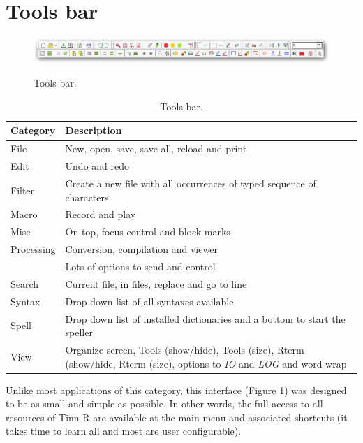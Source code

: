 
\hypertarget{working_toolsbar}{}
\section{Tools bar}

\begin{figure}[h!]
  \includegraphics[scale=0.35]{./res/toolsbar.png}\\
  \caption{Tools bar.}
  \label{fig:toolsbar}
\end{figure}

\begin{table}[h!]
  \begin{footnotesize}
    \begin{tabularx}{\textwidth}{>{\hsize=0.3\hsize}X>{\hsize=0.7\hsize}X}\\
      \hline
      \textbf{Category} & \textbf{Description} \\
      \hline
      File & New, open, save, save all, reload and print \\
      Edit & Undo and redo \\
      Filter & Create a new file with all occurrences of typed sequence of characters \\
      Macro & Record and play \\
      Misc & On top, focus control and block marks \\
      Processing & Conversion, compilation and viewer \\
      \RR{} & Lots of options to send and control \RR{} \\
      Search & Current file, in files, replace and go to line \\
      Syntax & Drop down list of all syntaxes available \\
      Spell & Drop down list of installed dictionaries and a bottom to start the speller \\
      View & Organize screen, Tools (show/hide), Tools (size), Rterm (show/hide, Rterm (size), options to \textit{IO} and \textit{LOG} and word wrap \\
      \hline
    \end{tabularx}
  \end{footnotesize}
  \caption{Tools bar.}
  \label{tab:toolsbar}
\end{table}

Unlike most applications of this category, this interface
(Figure \ref{fig:toolsbar})
was designed to be
as small and simple as possible. In other words, the full access to all
resources of Tinn-R are available at the main menu and associated shortcuts
(it takes time to learn all and most are user configurable).

